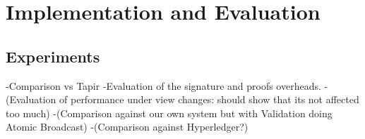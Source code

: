 \section{Implementation and Evaluation}

\subsection{Experiments}
-Comparison vs Tapir
-Evaluation of the signature and proofs overheads.
-(Evaluation of performance under view changes: should show that its not affected too much)
-(Comparison against our own system but with Validation doing Atomic Broadcast)
-(Comparison against Hyperledger?)

